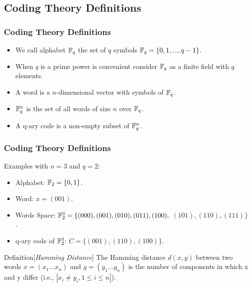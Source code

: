 \documentclass{beamer}
\begin{document}
\subsection{Coding Theory Definitions}

\begin{frame}
  \frametitle{Coding Theory Definitions}
{
	
\begin{itemize}
	\item<1-> We call alphabet $\Bbb{F}_{q}$ the set of $q$ symbols $\Bbb{F}_{q} = \{0, 1, ..., q-1\}$.
	\item<2-> When $q$ is a prime power is convenient consider $\Bbb{F}_{q}$ as a finite field with $q$ elements.
	\item<3-> A word is a $n$-dimensional vector with symbols of $\Bbb{F}_{q}$.
	\item<4-> $\Bbb{F}_{q}^{n}$ is the set of all words of size $n$ over $\Bbb{F}_{q}$.
	\item<5-> A q-ary code is a non-empty subset of $\Bbb{F}_{q}^{n}$.
\end{itemize}
}
\end{frame}


\begin{frame}
  \frametitle{Coding Theory Definitions}
{
	Examples with $n=3$ and $q=2$:
\begin{itemize}
	\item Alphabet: $\Bbb{F}_{2} = \{0,1\}$.
	\item Word: $x = (001)$.
	\item Words Space: $\Bbb{F}_{2}^{3} = \{(000), (001), (010), (011), (100),$ $ (101), (110), (111)\}$.
	\item q-ary code of $\Bbb{F}_{2}^{3}$: $C = \{(001), (110), (100)\}$.
\end{itemize}

\begin{block}{Definition}[\textit{Hamming Distance}]
The Hamming distance $d(x,y)$ between two words $x = (x_1 \ldots x_n)$ and $y = (y_1 \ldots y_n)$ is the number of components in which x and y differ (i.e., $|{x_i \neq y_i, 1 \leq i \leq n}|$).
\end{block}

}
\end{frame}
\end{document}
